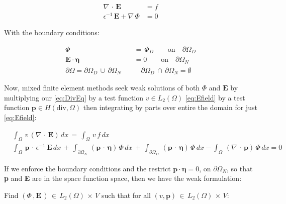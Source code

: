 \documentclass[10pt]{report}
\numberwithin{equation}{section}
\begin{document}
\begin{align}
\nabla \, \cdot \, \textbf{E} \, &= f \label{eq:DivEq}\\
\epsilon^{-1} \, \textbf{E} + \nabla \, \Phi &= 0 \label{eq:Efield}
\end{align}


\noindent
With the boundary conditions:


\begin{align}
\Phi \, &= \, \Phi_{D} \qquad \text{on} \quad \partial \Omega_{D} \\ 
\textbf{E} \cdot \boldsymbol \eta &= 0 \qquad \text{on} \quad \partial \Omega_{N} \label{eq:SystemNeumannBC} \\
 \partial \Omega = \partial \Omega_{D} \, \cup \, \partial \Omega_{N} \quad & \quad \partial \Omega_{D} \, \cap \, \partial \Omega_{N} = \emptyset
\end{align}


\vspace{2mm}


\noindent
Now, mixed finite element methods seek weak solutions of both $\Phi$ and $\textbf{E}$ by multiplying our \eqref{eq:DivEq} by a test function $v \in L_{2}(\Omega)$ \eqref{eq:Efield} by a test function $\textbf{p} \in H(\text{div}, \Omega)$ then integrating by parts over entire the domain for just \eqref{eq:Efield}:



  
\begin{align}
&\int_{\Omega}  \, v \, \left( \nabla  \, \cdot \, \textbf{E} \right) \, dx \, =  \, \int_{\Omega}  \,  v \, f \, dx  \\
&\int_{\Omega} \,  \textbf{p} \, \cdot \,  \epsilon^{-1} \, \textbf{E} \, dx \, 
+ \, \int_{\partial \Omega_{N}} \, \left( \textbf{p} \, \cdot \, \boldsymbol \eta \right) \, \Phi  \, dx  \,
+ \, \int_{\partial \Omega_{D}} \, \left( \textbf{p} \, \cdot \, \boldsymbol \eta \right) \, \Phi  \, dx  
-\int_{\Omega} \,  \left(\nabla \, \cdot \, \textbf{p} \right) \, \Phi \, dx = 0
\end{align}


\noindent
If we enforce the boundary conditions and the restrict $\textbf{p}
\cdot \boldsymbol \eta = 0$, on $\partial \Omega_{N}$, so that \textbf{p} and \textbf{E} are in the space function space, then we have the weak formulation:


\vspace{2mm}

\begin{center}
Find $(\Phi \, , \textbf{E} \, )\, \in \, L_{2}(\Omega) \, 
\times\, V$ such that for all $(v, \textbf{p}) \, \in \, L_{2}(\Omega) \, 
\times\, V$:
\end{center}
\end{document}
